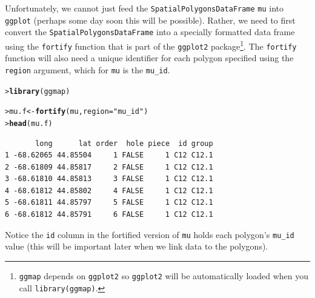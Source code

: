 \documentclass[12pt,oneside]{book}\usepackage[]{graphicx}\usepackage[]{color}
\makeatletter
\newcommand{\hlstr}[1]{\textcolor[rgb]{0.192,0.494,0.8}{#1}}%
\newcommand{\hlstd}[1]{\textcolor[rgb]{0.345,0.345,0.345}{#1}}%
\newcommand{\hlkwb}[1]{\textcolor[rgb]{0.69,0.353,0.396}{#1}}%
\newcommand{\hlkwc}[1]{\textcolor[rgb]{0.333,0.667,0.333}{#1}}%
\newcommand{\hlkwd}[1]{\textcolor[rgb]{0.737,0.353,0.396}{\textbf{#1}}}%
\newenvironment{kframe}{%
 \def\at@end@of@kframe{}%
 \ifinner\ifhmode%
  \def\at@end@of@kframe{\end{minipage}}%
  \begin{minipage}{\columnwidth}%
 \fi\fi%
 \def\FrameCommand##1{\hskip\@totalleftmargin \hskip-\fboxsep
 \colorbox{shadecolor}{##1}\hskip-\fboxsep
     \hskip-\linewidth \hskip-\@totalleftmargin \hskip\columnwidth}%
 \MakeFramed {\advance\hsize-\width
   \@totalleftmargin\z@ \linewidth\hsize
   \@setminipage}}%
 {\par\unskip\endMakeFramed%
 \at@end@of@kframe}
\newenvironment{knitrout}{}{} %
\makeatother
\begin{document}
Unfortunately, we cannot just feed the \verb+SpatialPolygonsDataFrame+ \verb+mu+ into \verb+ggplot+ (perhaps some day soon this will be possible). Rather, we need to first convert the \verb+SpatialPolygonsDataFrame+ into a specially formatted data frame using the \verb+fortify+ function that is part of the \verb+ggplot2+ package\footnote{\texttt{ggmap} depends on \texttt{ggplot2} so \texttt{ggplot2} will be automatically loaded when you call \texttt{library(ggmap)}.}. The \verb+fortify+ function will also need a unique identifier for each polygon specified using the \verb+region+ argument, which for \verb+mu+ is the \verb+mu_id+.

\begin{knitrout}
\color{fgcolor}\begin{kframe}
\begin{alltt}
\hlstd{> }\hlkwd{library}\hlstd{(ggmap)}
\end{alltt}


{\ttfamily\noindent\itshape\color{messagecolor}{\\Attaching package: 'ggmap'}}

{\ttfamily\noindent\itshape\color{messagecolor}{The following object is masked \_by\_ '.GlobalEnv':

\ \ \ \ crime}}\begin{alltt}
\hlstd{> }\hlstd{mu.f} \hlkwb{<-} \hlkwd{fortify}\hlstd{(mu,} \hlkwc{region} \hlstd{=} \hlstr{"mu_id"}\hlstd{)}
\hlstd{> }\hlkwd{head}\hlstd{(mu.f)}
\end{alltt}
\begin{verbatim}
       long      lat order  hole piece  id group
1 -68.62065 44.85504     1 FALSE     1 C12 C12.1
2 -68.61809 44.85817     2 FALSE     1 C12 C12.1
3 -68.61810 44.85813     3 FALSE     1 C12 C12.1
4 -68.61812 44.85802     4 FALSE     1 C12 C12.1
5 -68.61811 44.85797     5 FALSE     1 C12 C12.1
6 -68.61812 44.85791     6 FALSE     1 C12 C12.1
\end{verbatim}
\end{kframe}
\end{knitrout}
Notice the \verb+id+ column in the fortified version of \verb+mu+ holds each polygon's \verb+mu_id+ value (this will be important later when we link data to the polygons).
\end{document}
